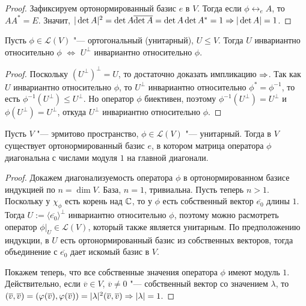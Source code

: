 \begin{proof}
	Зафиксируем ортонормированный базис $e$ в $V$. Тогда если $\phi \leftrightarrow_e A$, то $AA^* = E$. Значит, $|\det{A}|^2 \hm{=} \det{A}\overline{\det{A}} = \det{A}\det{A^*} = 1 \ra |\det{A}| = 1$.
\end{proof}

\begin{proposition}
	Пусть $\phi\in \mathcal{L}(V)$ "--- ортогональный (унитарный), $U \le V$. Тогда $U$ инвариантно относительно $\phi$ $\Leftrightarrow$ $U^\perp$ инвариантно относительно $\phi$.
\end{proposition}

\begin{proof}
	Поскольку $(U^\perp)^\perp = U$, то достаточно доказать импликацию $\Rightarrow$. Так как $U$ инвариантно относительно $\phi$, то $U^\perp$ инвариантно относительно $\phi^* = \phi^{-1}$, то есть $\phi^{-1}(U^\perp) \le U^\perp$. Но оператор $\phi$ биективен, поэтому $\phi^{-1}(U^\perp) = U^\perp$ и $\phi(U^\perp) = U^\perp$, откуда $U^\perp$ инвариантно относительно $\phi$.
\end{proof}

\begin{theorem}
	Пусть $V$ "--- эрмитово пространство, $\phi \in \mathcal{L}(V)$ "--- унитарный. Тогда в $V$ существует ортонормированный базис $e$, в котором матрица оператора $\phi$ диагональна с числами модуля $1$ на главной диагонали.
\end{theorem}

\begin{proof}
	Докажем диагонализуемость оператора $\phi$ в ортонормированном базисе индукцией по $n = \dim{V}$. База, $n = 1$, тривиальна. Пусть теперь $n > 1$. Поскольку у $\chi_\phi$ есть корень над $\mathbb{C}$, то у $\phi$ есть собственный вектор $\overline{e_0}$ длины $1$. Тогда $U := \langle\overline{e_0}\rangle^\perp$ инвариантно относительно $\phi$, поэтому можно расмотреть оператор $\phi|_{U} \in \mathcal{L}(V)$, который также является унитарным. По предположению индукции, в $U$ есть ортонормированный базис из собственных векторов, тогда объединение с $\overline{e_0}$ дает искомый базис в $V$.
	
	Покажем теперь, что все собственные значения оператора $\phi$ имеют модуль $1$. Действительно, если $\overline{v} \in V$, $\overline{v} \ne 0$ "--- собственный вектор со значением $\lambda$, то $(\overline{v}, \overline{v}) = (\phi(\overline{v}), \phi(\overline{v})) \hm= |\lambda|^2(\overline{v}, \overline{v}) \Rightarrow |\lambda| = 1$.
\end{proof}

